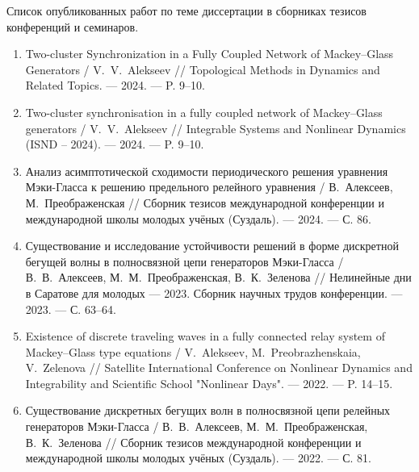 Список опубликованных работ по теме диссертации в сборниках тезисов конференций и семинаров.
\begin{enumerate}
	\item Two-cluster Synchronization in a Fully Coupled Network of	Mackey--Glass Generators / V.~V.~Alekseev // Topological Methods in Dynamics and Related Topics. --- 2024. --- P. 9--10. \cite{confbib6}
	\item Two-cluster synchronisation in a fully coupled network of	Mackey--Glass generators / V.~V.~Alekseev // Integrable Systems and Nonlinear Dynamics (ISND -- 2024). --- 2024. --- P. 9--10. \cite{confbib5}
	\item Анализ асимптотической сходимости периодического решения уравнения Мэки-Гласса к решению предельного релейного уравнения	/ В.~Алексеев, М.~Преображенская // Сборник тезисов международной конференции и международной школы молодых учёных (Суздаль). --- 2024. --- С. 86. \cite{confbib3}
	\item Существование и исследование устойчивости решений в форме дискретной бегущей волны в полносвязной цепи генераторов	Мэки-Гласса / В.~В.~Алексеев, М.~М.~Преображенская, В.~К.~Зеленова // Нелинейные дни в Саратове для молодых --- 2023. Сборник научных трудов конференции. --- 2023. --- С. 63--64. \cite{confbib2}
	\item Existence of discrete traveling waves in a fully connected relay system of Mackey–Glass type equations / V.~Alekseev, M.~Preobrazhenskaia, V.~Zelenova // Satellite International Conference on Nonlinear Dynamics and Integrability and Scientific School "Nonlinear Days". --- 2022. --- P. 14--15. \cite{confbib4}
	\item Существование дискретных бегущих волн в полносвязной цепи релейных генераторов Мэки-Гласса / В.~В.~Алексеев, М.~М.~Преображенская, В.~К.~Зеленова // Сборник тезисов международной конференции и международной школы молодых учёных (Суздаль). --- 2022. --- С. 81. \cite{confbib1}
\end{enumerate}


